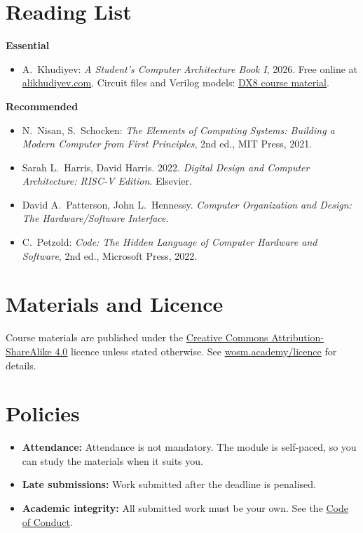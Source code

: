 \documentclass[11pt,a4paper]{article}
\begin{document}
\section{Reading List}
\textbf{Essential}
\begin{itemize}
  \item A.\ Khudiyev: \textit{A Student's Computer Architecture Book I}, 2026.
        Free online at
        \href{https://alikhudiyev.com/courses/self-study/computer-architecture/tutorial/book/2026/05/12/computer-architecture-1.html}{alikhudiyev.com}.
        Circuit files and Verilog models:
        \href{https://github.com/AliKhudiyev/alikhudiyev.github.io/tree/main/assets/courses/comp-arch}{DX8 course material}.
\end{itemize}
\textbf{Recommended}
\begin{itemize}
  \item N.\ Nisan, S.\ Schocken: \textit{The Elements of Computing Systems:
        Building a Modern Computer from First Principles}, 2nd ed., MIT Press, 2021.
  \item Sarah L.\ Harris, David Harris. 2022. \textit{Digital Design and Computer
        Architecture: RISC-V Edition}. Elsevier.
  \item David A.\ Patterson, John L.\ Hennessy. \textit{Computer Organization and
        Design: The Hardware/Software Interface}.
  \item C.\ Petzold: \textit{Code: The Hidden Language of Computer Hardware and
        Software}, 2nd ed., Microsoft Press, 2022.
\end{itemize}

\section{Materials and Licence}
Course materials are published under the
\href{https://creativecommons.org/licenses/by-sa/4.0/}{Creative Commons Attribution-ShareAlike 4.0}
licence unless stated otherwise. See \href{https://wosm.academy/licence/}{wosm.academy/licence} for details.

\section{Policies}
\begin{itemize}
  \item \textbf{Attendance:} Attendance is not mandatory. The module is self-paced, so you can study the materials when it suits you.
  \item \textbf{Late submissions:} Work submitted after the deadline is penalised.
  \item \textbf{Academic integrity:} All submitted work must be your own.
        See the \href{https://wosm.academy/code-of-conduct/}{Code of Conduct}.
\end{itemize}
\end{document}
